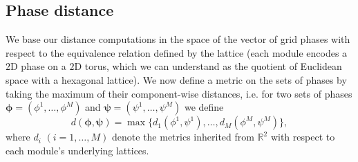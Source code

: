 \documentclass[12pt]{article}
\begin{document}
\subsection{Phase distance}
%
We base our distance computations in the space of the vector of grid phases with respect to the equivalence relation defined by the lattice (each module encodes a $2$D phase on a $2$D torus, which we can understand as the quotient of Euclidean space with a hexagonal lattice). We now define a metric on the sets of phases by taking the maximum of their component-wise distances, i.e. for two sets of phases $\boldsymbol\phi = (\phi^1,\ldots, \phi^M )$ and $\boldsymbol\psi = (\psi^1,\ldots, \psi^M)$ we define
\[
          d(\boldsymbol\phi, \boldsymbol\psi) =  \max \big\{ d_{1}(\phi^1,\psi^1),\ldots, d_M(\phi^M,\psi^M) \big\},
\]
where $d_i$ $(i=1,\ldots,M)$ denote the metrics inherited from $\mathbb{R}^2$ with respect to each module's underlying lattices.
\end{document}
